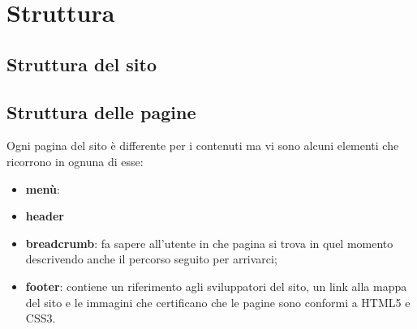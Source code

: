 \section{Struttura}
\subsection{Struttura del sito}
\subsection{Struttura delle pagine}
Ogni pagina del sito è differente per i contenuti ma vi sono alcuni elementi che ricorrono in ognuna di esse:
\begin{itemize}
	\item \textbf{menù}: 
	\item \textbf{header}
	\item \textbf{breadcrumb}: fa sapere all'utente in che pagina si trova in quel momento descrivendo anche il percorso seguito per arrivarci;
	\item \textbf{footer}: contiene un riferimento agli sviluppatori del sito, un link alla mappa del sito e le immagini che certificano che le pagine sono conformi a HTML5 e CSS3.
\end{itemize}